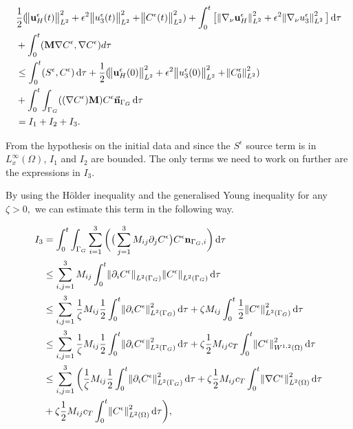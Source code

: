 \documentclass[11pt]{article}
\newcommand*\diff{\mathop{}\!\mathrm{d}}
\begin{document}
  \begin{equation}
    \begin{split}  
    & \frac{1}{2} (\norm{\mathbf{u}_H^\epsilon (t)}_{L^2}^2 + \epsilon ^ 2 \norm{u_3^\epsilon (t)}_{L^2}^2 + \norm{C^\epsilon (t)}_{L^2}^2) + \int_0 ^ t \big[ \norm{\nabla_\nu \mathbf{u}_H^\epsilon}_{L^2}^2 + \epsilon ^ 2 \norm{\nabla_\nu u_3^\epsilon}_{L^2}^2  \big] \diff \tau \\
    & + \int_0 ^ t  (\mathbf{M} \nabla C^\epsilon, \nabla C^\epsilon) d \tau \\
    & \leq \int_0^t (S^\epsilon,C^\epsilon) \diff \tau + \frac{1}{2} (\norm{\mathbf{u}_H^\epsilon (0)}_{L^2}^2 + \epsilon ^ 2 \norm{u_3^\epsilon (0)}_{L^2}^2 + \norm{C^\epsilon_0}_{L^2}^2) \\
    & + \int _ 0 ^ t  \int_{\Gamma_G} ((\nabla C^\epsilon) \mathbf{M}) C^\epsilon \vec{\mathbf{n}}_{\Gamma_G}  \diff \tau \\
    & = I_1 + I_2 + I_3. \raisetag{70pt} \label{energyIEQ}
    \end{split}
  \end{equation}    
  
  From the hypothesis on the initial data and since the $S^\epsilon$ source term is in $L^\infty_x (\Omega)$, $I_1$ and $I_2$ are bounded. The only terms we need to work on further are the expressions in $I_3$.
  
  By using the H\"older inequality and the generalised Young inequality for any $\zeta > 0,$ we can estimate this term in the following way.
  
  \begin{equation}
    \begin{split}  \label{boundI_3}
    I_3 & = \int _ 0 ^ t \int_{\Gamma_G} \sum_{i=1}^3 \bigg( \big(\sum_{j=1}^3 M_{ij} \partial_j C^\epsilon \big) C^\epsilon \mathbf{n}_{\Gamma_G, i} \bigg) \diff \tau \\
    & \leq \sum_{i,j = 1}^3 M_{ij} \int _ 0 ^ t \norm{\partial_i C^\epsilon}_{L^2 (\Gamma_G)}  \norm{C^\epsilon}_{L^2 (\Gamma_G)} \diff \tau \\
    & \leq \sum_{i,j = 1}^3 \frac{1}{\zeta} M_{ij} \frac{1}{2} \int_0 ^ t \norm{\partial_i C^\epsilon}^2 _{L^2 (\Gamma_G)} \diff \tau + \zeta M_{ij} \int_0 ^ t \frac{1}{2} \norm{C^\epsilon}^2 _{L^2 (\Gamma_G)} \diff \tau \\
    & \leq \sum_{i,j = 1}^3 \frac{1}{\zeta} M_{ij} \frac{1}{2} \int_0 ^ t \norm{\partial_i C^\epsilon}^2 _{L^2 (\Gamma_G)} \diff \tau + \zeta \frac{1}{2} M_{ij} c_T \int_0 ^ t \norm{C^\epsilon}^2 _{W^{1,2} (\Omega)} \diff \tau \\
    & \leq \sum_{i,j = 1}^3 \bigg( \frac{1}{\zeta} M_{ij} \frac{1}{2} \int_0 ^ t \norm{\partial_i C^\epsilon}^2 _{L^2 (\Gamma_G)} \diff \tau + \zeta \frac{1}{2} M_{ij} c_T  \int_0 ^ t \norm{\nabla C^\epsilon}^2 _{L^2 (\Omega) }  \diff \tau \\
    & + \zeta \frac{1}{2} M_{ij} c_T  \int_0 ^ t \norm{C^\epsilon}^2 _{L^2 (\Omega) } \diff \tau \bigg), \raisetag{30pt}
    \end{split}
  \end{equation}  
  
\end{document}

